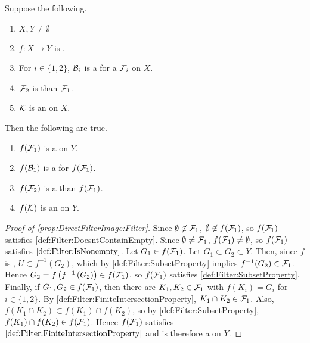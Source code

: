 \begin{prop}
\label{prop:DirectFilterImage}
Suppose the following. 
\begin{enumerate}
    \item $X,Y \neq \emptyset$
    \item $f:X \to Y$ is \Surjective.
    \item For $i \in \{1,2\}$, $\mathcal{B}_i$ is a \FilterBase for a \Filter $\mathcal{F}_i$ on $X$. 
    \item $\mathcal{F}_2$ is \FinerFilter than $\mathcal{F}_1$. 
    \item $\mathcal{K}$ is an \UltrafilterBase on $X$. 
\end{enumerate}
Then the following are true.
\begin{enumerate}[label=(\roman*), ref={\ref{prop:DirectFilterImage}.~\roman*}]
\item \label{prop:DirectFilterImage:Filter} $f(\mathcal{F}_1)$ is a \Filter on $Y$. 
\item \label{prop:DirectFilterImage:Base} $f(\mathcal{B}_1)$ is a \FilterBase for $f(\mathcal{F}_1)$. 
\item \label{prop:DirectFilterImage:Order} $f(\mathcal{F}_2)$ is a \FinerFilter than $f(\mathcal{F}_1)$. 
\item \label{prop:DirectFilterImage:Ultrafilter} $f(\mathcal{K})$ is an \UltrafilterBase on $Y$. 
\end{enumerate}
\begin{proof}[Proof of \ref{prop:DirectFilterImage:Filter}]
    Since $\emptyset \not \in \mathcal{F}_1$, 
    $\emptyset \not \in f(\mathcal{F}_1)$, so 
    $f(\mathcal{F}_1)$ satisfies \ref{def:Filter:DoesntContainEmpty}.
    Since $\emptyset \neq \mathcal{F}_1$, $f(\mathcal{F}_1) \neq \emptyset$, 
    so $f(\mathcal{F}_1)$ satisfies $\ref{def:Filter:IsNonempty}$.
    Let $G_1 \in f(\mathcal{F}_1)$. Let $G_1 \subset G_2 \subset Y$. 
    Then, since $f$ is \Surjective, $U \subset f^{-1}(G_2)$, 
    which by 
    \ref{def:Filter:SubsetProperty} implies $f^{-1}(G_2) \in \mathcal{F}_1$. 
    Hence $G_2=f\left( f^{-1}\left( G_2\right)\right) \in f(\mathcal{F}_1)$, so 
    $f(\mathcal{F}_1)$ satisfies \ref{def:Filter:SubsetProperty}. 
    Finally, if $G_1,G_2 \in f(\mathcal{F}_1)$, then 
    there are $K_1,K_2 \in \mathcal{F}_1$ with $f(K_i) =G_i$ for $i \in \{1,2\}$. 
    By \ref{def:Filter:FiniteIntersectionProperty}, $K_1 \cap K_2 \in \mathcal{F}_1$. 
    Also, $f(K_1 \cap K_2) \subset f(K_1) \cap f(K_2)$, 
    so by \ref{def:Filter:SubsetProperty}, $f(K_1) \cap f(K_2) \in f(\mathcal{F}_1)$.
    Hence $f(\mathcal{F}_1)$ satisfies $\ref{def:Filter:FiniteIntersectionProperty}$
    and is therefore a \Filter on $Y$. 
\end{proof}

\end{prop}
